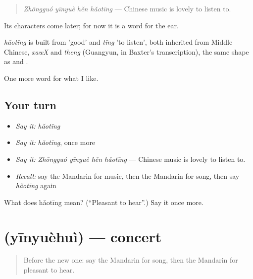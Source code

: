 \begin{quote}
\emph{Zhōngguó yīnyuè hěn hǎotīng} — Chinese music is lovely to listen to.
\end{quote}

Its characters come later; for now it is a word for the ear.

\begin{cousinweb}
\emph{hǎotīng} is built from  'good' and \emph{tīng} 'to listen', both inherited from Middle Chinese, \emph{xawX} and \emph{theng} (Guangyun, in Baxter's transcription), the same shape as  and .
\end{cousinweb}

\begin{grammarlens}[title={What you've built}]
One more word for what I like.
\end{grammarlens}

\subsection*{Your turn}
\begin{itemize}
\raggedright
  \item \emph{Say it:} \emph{hǎotīng}
  \item \emph{Say it:} \emph{hǎotīng}, once more
  \item \emph{Say it:} \emph{Zhōngguó yīnyuè hěn hǎotīng} — Chinese music is lovely to listen to.
  \item \emph{Recall:} say the Mandarin for music, then the Mandarin for song, then say \emph{hǎotīng} again
\end{itemize}

\begin{tcolorbox}[breakable,colback=teal!4,colframe=teal!35!black,title={Before you move on}]
What does hǎotīng mean? (\textquotedblleft{}Pleasant to hear\textquotedblright{}.) Say it once more.
\end{tcolorbox}
\section[\texorpdfstring{\zh{音乐会} (yīnyuèhuì)}{音乐会 (yīnyuèhuì)}]{ (yīnyuèhuì) — concert}

\label{lesson:ZH-C128-yinyuehui}



\begin{quote}
Before the new one: say the Mandarin for song, then the Mandarin for pleasant to hear.
\end{quote}

